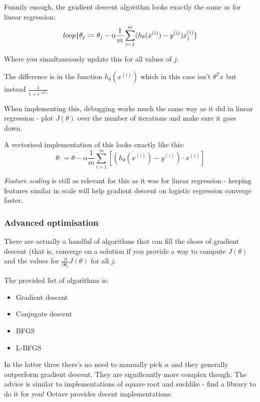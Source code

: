 Funnily enough, the gradient descent algorithm looks exactly the same as for linear regression:
\begin{equation}
loop \{\\
\theta_j \mathrel{\mathop:}=
\theta_j - \alpha\frac{1}{m}
\sum_{i=1}^{m}
(h_\theta(x^{(i)}) - y^{(i)})x_j^{(i)} \\
\}
\end{equation}

Where you simultaneously update this for all values of $j$.

The difference is in the function $h_\theta(x^{(i)})$ which in this case isn't $\theta^Tx$ but instead $\frac{1}{1 + e^{-\theta^Tx}}$

When implementing this, debugging works much the same way as it did in linear regression - plot $J(\theta)$ over the number of iterations and make sure it goes down.

A vectorised implementation of this looks exactly like this:
\[
\theta \mathrel{\mathop:}=
\theta - \alpha\frac{1}{m}
\sum_{i=1}^{m}
[(h_\theta(x^{(i)}) - y^{(i)}) \cdot x^{(i)}]
\]

\emph{Feature scaling} is still as relevant for this as it was for linear regression - keeping features similar in scale will help gradient descent on logistic regression converge faster.

\subsubsection{Advanced optimisation}
There are actually a handful of algorithms that can fill the shoes of gradient descent (that is, converge on a solution if you provide a way to compute $J(\theta)$ and the values for $\frac{\partial}{\partial\theta_j}J(\theta)$ for all $j$.

The provided list of algorithms is:

\begin{itemize}
\item Gradient descent
\item Conjugate descent
\item BFGS
\item L-BFGS
\end{itemize}

In the latter three there's no need to manually pick $\alpha$ and they generally outperform gradient descent. They are significantly more complex though. The advice is similar to implementations of square root and suchlike - find a library to do it for you! Octave provides decent implementations.

